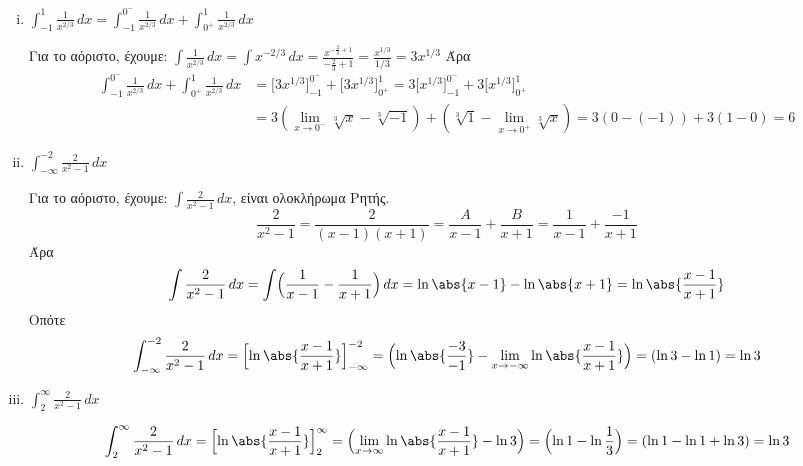 \begin{enumerate}[i)]
  \item $ \boxed{\int _{-1}^{1} \frac{1}{x^{2/3}} \,{dx}} = 
    \int _{-1}^{0^-} \frac{1}{x^{2/3}} \,{dx} + \int _{0^{+}}^{1} 
    \frac{1}{x^{2/3}} \,{dx} $
    \begin{solution}
      Για το αόριστο, έχουμε: $ \int \frac{1}{x^{2/3}} \,{dx} = \int x^{-2/3} \,{dx} =
      \frac{x^{- \frac{2}{3} +1}}{- \frac{2}{3}+1} = \frac{x^{1/3}}{1/3} = 3
      x^{1/3} $
      Άρα
      \begin{align*}
        \int _{-1}^{0^-} \frac{1}{x^{2/3}} \,{dx} + \int _{0^{+}}^{1} 
        \frac{1}{x^{2/3}} \,{dx} 
        &= \bigl[3 x^{1/3}\bigr]_{-1}^{0^-} + \bigl[3 x^{1/3}\bigr]_{0^+}^{1} =  
        3\bigl[x^{1/3}\bigr]_{-1}^{0^-} + 3\bigl[x^{1/3}\bigr]_{0^+}^{1} \\ 
        &=  3 (\lim_{x \to 0^-} \sqrt[3]{x} - \sqrt[3]{-1}) + 
        ( \sqrt[3]{1} - \lim_{x \to 0^+} \sqrt[3]{x}) = 3 (0-(-1)) + 3(1-0) = 6 
      \end{align*}
    \end{solution}

  \item $ \boxed{\int _{- \infty}^{-2} \frac{2}{x^{2}-1} \,{dx}} $ 
    \begin{solution}
      Για το αόριστο, έχουμε: $ \int \frac{2}{x^{2}-1}  \,{dx} $, είναι ολοκλήρωμα Ρητής.
      \[
        \frac{2}{x^{2}-1} = \frac{2}{(x-1)(x+1)} = \frac{A}{x-1} + \frac{B}{x+1} =
        \frac{1}{x-1} + \frac{-1}{x+1}
      \] 
      Άρα
      \[
        \int \frac{2}{x^2-1} \,{dx} = \int \Bigl(\frac{1}{x-1} - \frac{1}{x+1}\Bigr) 
        \,{dx} = \ln{\abs{x-1} - \ln{\abs{x+1}}} = \ln{\abs{\frac{x-1}{x+1}}}  
      \] 
      Οπότε
      \[
        \int _{- \infty}^{-2} \frac{2}{x^{2}-1} \,{dx} =
        \Bigl[\ln{\abs{\frac{x-1}{x+1}}}\Bigr]_{- \infty}^{-2} =
        \Bigl(\ln{\abs{\frac{-3}{-1}}} -
        \lim_{x \to - \infty} \ln{\abs{\frac{x-1}{x+1}}}\Bigr) = ( \ln{3} - \ln{1}) =
        \ln{3}
      \] 
    \end{solution}

  \item $ \boxed{\int _{2}^{\infty} \frac{2}{x^{2}-1} \,{dx}} $
    \begin{solution}
      \[
        \int _{2}^{\infty} \frac{2}{x^{2}-1} \,{dx} = \Bigl[\ln{\abs{\frac{x-1}{x+1}}}
        \Bigr]_{2}^{\infty} = \Bigl(\lim_{x \to \infty} 
        \ln{\abs{\frac{x-1}{x+1}} - \ln{3}}\Bigr) = \Bigl(
        \ln{1} - \ln{\frac{1}{3}}\Bigr) = (\ln{1} - \ln{1} + \ln{3}) = \ln{3}
      \] 
    \end{solution}


\end{enumerate}
